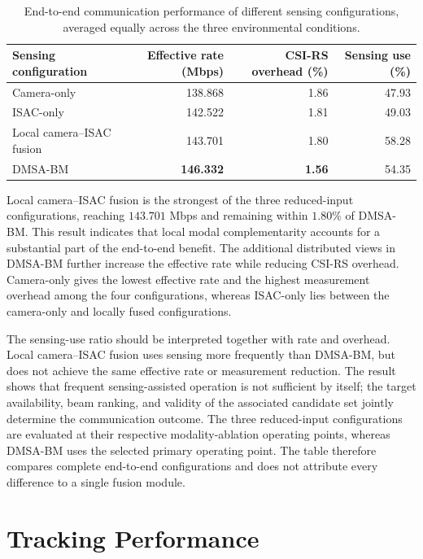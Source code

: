 \begin{table}[H]
    \centering
    \caption{End-to-end communication performance of different sensing
    configurations, averaged equally across the three environmental
    conditions.}
    \label{tab:experiments-sensing-configuration-system}
    \small
    \renewcommand{\arraystretch}{1.10}
    \begin{tabular}{lrrr}
        \toprule
        Sensing configuration & Effective rate (Mbps) &
        CSI-RS overhead (\%) & Sensing use (\%) \\
        \midrule
        Camera-only & 138.868 & 1.86 & 47.93 \\
        ISAC-only & 142.522 & 1.81 & 49.03 \\
        Local camera--ISAC fusion & 143.701 & 1.80 & 58.28 \\
        DMSA-BM & \textbf{146.332} & \textbf{1.56} & 54.35 \\
        \bottomrule
    \end{tabular}
\end{table}

Local camera--ISAC fusion is the strongest of the three reduced-input
configurations, reaching \(143.701\) Mbps and remaining within \(1.80\%\) of
DMSA-BM.  This result indicates that local modal complementarity accounts for a
substantial part of the end-to-end benefit.  The additional distributed views
in DMSA-BM further increase the effective rate while reducing CSI-RS overhead.
Camera-only gives the lowest effective rate and the highest measurement
overhead among the four configurations, whereas ISAC-only lies between the
camera-only and locally fused configurations.

The sensing-use ratio should be interpreted together with rate and overhead.
Local camera--ISAC fusion uses sensing more frequently than DMSA-BM, but does
not achieve the same effective rate or measurement reduction.  The result shows
that frequent sensing-assisted operation is not sufficient by itself; the
target availability, beam ranking, and validity of the associated candidate set
jointly determine the communication outcome.  The three reduced-input
configurations are evaluated at their respective modality-ablation operating
points, whereas DMSA-BM uses the selected primary operating point.  The table
therefore compares complete end-to-end
configurations and does not attribute every difference to a single fusion
module.

\section{Tracking Performance}
\label{sec:experiments-tracking}

